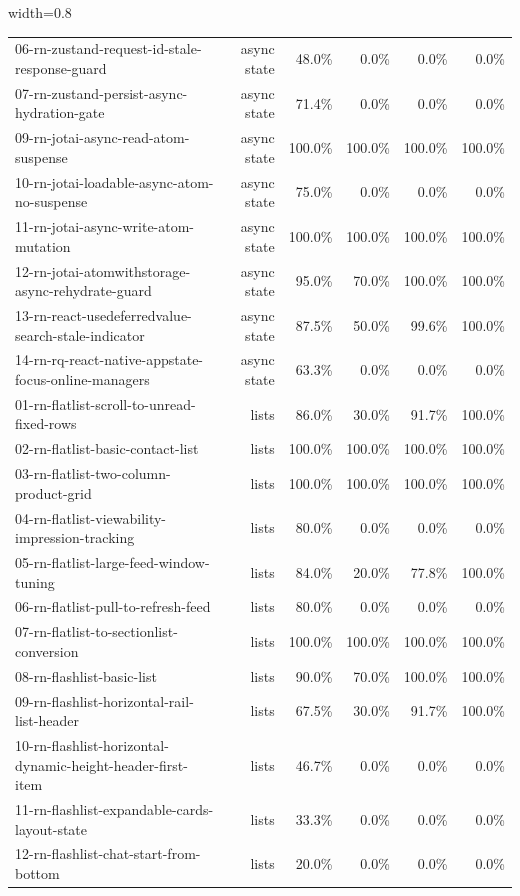 \begin{table}[htbp]
\begin{adjustbox}{width=0.8\textwidth}
\begin{tabular}{lrrrrr}
06-rn-zustand-request-id-stale-response-guard & async state & 48.0\% & 0.0\% & 0.0\% & 0.0\% \\
07-rn-zustand-persist-async-hydration-gate & async state & 71.4\% & 0.0\% & 0.0\% & 0.0\% \\
09-rn-jotai-async-read-atom-suspense & async state & 100.0\% & 100.0\% & 100.0\% & 100.0\% \\
10-rn-jotai-loadable-async-atom-no-suspense & async state & 75.0\% & 0.0\% & 0.0\% & 0.0\% \\
11-rn-jotai-async-write-atom-mutation & async state & 100.0\% & 100.0\% & 100.0\% & 100.0\% \\
12-rn-jotai-atomwithstorage-async-rehydrate-guard & async state & 95.0\% & 70.0\% & 100.0\% & 100.0\% \\
13-rn-react-usedeferredvalue-search-stale-indicator & async state & 87.5\% & 50.0\% & 99.6\% & 100.0\% \\
14-rn-rq-react-native-appstate-focus-online-managers & async state & 63.3\% & 0.0\% & 0.0\% & 0.0\% \\
01-rn-flatlist-scroll-to-unread-fixed-rows & lists & 86.0\% & 30.0\% & 91.7\% & 100.0\% \\
02-rn-flatlist-basic-contact-list & lists & 100.0\% & 100.0\% & 100.0\% & 100.0\% \\
03-rn-flatlist-two-column-product-grid & lists & 100.0\% & 100.0\% & 100.0\% & 100.0\% \\
04-rn-flatlist-viewability-impression-tracking & lists & 80.0\% & 0.0\% & 0.0\% & 0.0\% \\
05-rn-flatlist-large-feed-window-tuning & lists & 84.0\% & 20.0\% & 77.8\% & 100.0\% \\
06-rn-flatlist-pull-to-refresh-feed & lists & 80.0\% & 0.0\% & 0.0\% & 0.0\% \\
07-rn-flatlist-to-sectionlist-conversion & lists & 100.0\% & 100.0\% & 100.0\% & 100.0\% \\
08-rn-flashlist-basic-list & lists & 90.0\% & 70.0\% & 100.0\% & 100.0\% \\
09-rn-flashlist-horizontal-rail-list-header & lists & 67.5\% & 30.0\% & 91.7\% & 100.0\% \\
10-rn-flashlist-horizontal-dynamic-height-header-first-item & lists & 46.7\% & 0.0\% & 0.0\% & 0.0\% \\
11-rn-flashlist-expandable-cards-layout-state & lists & 33.3\% & 0.0\% & 0.0\% & 0.0\% \\
12-rn-flashlist-chat-start-from-bottom & lists & 20.0\% & 0.0\% & 0.0\% & 0.0\% \\

\end{tabular}
\end{adjustbox}
\end{table}
